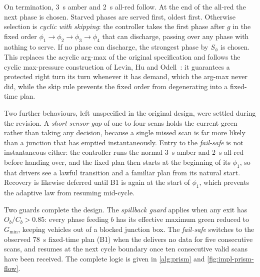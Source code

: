On termination, 3~s amber and 2~s all-red follow. At the end of the all-red the next phase is chosen. Starved
phases are served first, oldest first. Otherwise selection is \emph{cyclic with skipping}: the controller
takes the first phase after $g$ in the fixed order $\phi_1 \rightarrow \phi_2 \rightarrow \phi_3 \rightarrow
\phi_4$ that can discharge, passing over any phase with nothing to serve. If no phase can discharge, the
strongest phase by $S_\phi$ is chosen. This replaces the acyclic arg-max of the original specification and
follows the cyclic max-pressure construction of Levin, Hu and
Odell~\cite{levin2020cyclic,le2015decentralized}: it guarantees a protected right turn its turn whenever it
has demand, which the arg-max never did, while the skip rule prevents the fixed order from degenerating into
a fixed-time plan.

Two further behaviours, left unspecified in the original design, were settled during the revision. A
\emph{short sensor gap} of one to four scans holds the current green rather than taking any decision, because
a single missed scan is far more likely than a junction that has emptied instantaneously. Entry to the
\emph{fail-safe} is not instantaneous either: the controller runs the normal 3~s amber and 2~s all-red before
handing over, and the fixed plan then starts at the beginning of its $\phi_1$, so that drivers see a lawful
transition and a familiar plan from its natural start. Recovery is likewise deferred until B1 is again at the
start of $\phi_1$, which prevents the adaptive law from resuming mid-cycle.

Two guards complete the design. The \emph{spillback guard} applies when any exit has
$O_b/C_b > 0.85$: every phase feeding $b$ has its effective maximum green reduced to $G_{\min}$, keeping vehicles out of a blocked junction box. The \emph{fail-safe} switches to the observed 78~s fixed-time plan
(B1) when the \vls{} delivers no data for five consecutive scans, and \prism{} resumes at the next
cycle boundary once ten consecutive valid scans have been received.  The complete logic is given in \cref{alg:prism} and
\cref{fig:impl-prism-flow}.

